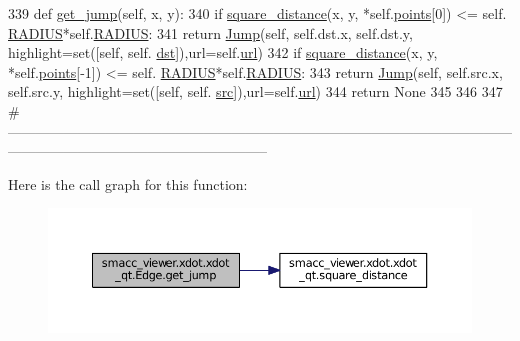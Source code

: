 \begin{DoxyCode}
339     \textcolor{keyword}{def }\hyperlink{classsmacc__viewer_1_1xdot_1_1xdot__qt_1_1Edge_a6cff1a5dcb4d832e98cdc92ddb130d9e}{get\_jump}(self, x, y):
340         \textcolor{keywordflow}{if} \hyperlink{namespacesmacc__viewer_1_1xdot_1_1xdot__qt_a15a27993ec08c2d9f757df121bb482f8}{square\_distance}(x, y, *self.\hyperlink{classsmacc__viewer_1_1xdot_1_1xdot__qt_1_1Edge_ac0a98c09c470ac737011283bb9e6108e}{points}[0]) <= self.
      \hyperlink{classsmacc__viewer_1_1xdot_1_1xdot__qt_1_1Edge_ad7c0b0732d1f024cf4bd1e379dd8d470}{RADIUS}*self.\hyperlink{classsmacc__viewer_1_1xdot_1_1xdot__qt_1_1Edge_ad7c0b0732d1f024cf4bd1e379dd8d470}{RADIUS}:
341             \textcolor{keywordflow}{return} \hyperlink{classsmacc__viewer_1_1xdot_1_1xdot__qt_1_1Jump}{Jump}(self, self.dst.x, self.dst.y, highlight=set([self, self.
      \hyperlink{classsmacc__viewer_1_1xdot_1_1xdot__qt_1_1Edge_ac3d671e3f4486291b249df4608b775b5}{dst}]),url=self.\hyperlink{classsmacc__viewer_1_1xdot_1_1xdot__qt_1_1Edge_acadf98140ce469bcbf1856232220ead7}{url})
342         \textcolor{keywordflow}{if} \hyperlink{namespacesmacc__viewer_1_1xdot_1_1xdot__qt_a15a27993ec08c2d9f757df121bb482f8}{square\_distance}(x, y, *self.\hyperlink{classsmacc__viewer_1_1xdot_1_1xdot__qt_1_1Edge_ac0a98c09c470ac737011283bb9e6108e}{points}[-1]) <= self.
      \hyperlink{classsmacc__viewer_1_1xdot_1_1xdot__qt_1_1Edge_ad7c0b0732d1f024cf4bd1e379dd8d470}{RADIUS}*self.\hyperlink{classsmacc__viewer_1_1xdot_1_1xdot__qt_1_1Edge_ad7c0b0732d1f024cf4bd1e379dd8d470}{RADIUS}:
343             \textcolor{keywordflow}{return} \hyperlink{classsmacc__viewer_1_1xdot_1_1xdot__qt_1_1Jump}{Jump}(self, self.src.x, self.src.y, highlight=set([self, self.
      \hyperlink{classsmacc__viewer_1_1xdot_1_1xdot__qt_1_1Edge_a5689e7ea2be54c94ae961b28c75199da}{src}]),url=self.\hyperlink{classsmacc__viewer_1_1xdot_1_1xdot__qt_1_1Edge_acadf98140ce469bcbf1856232220ead7}{url})
344         \textcolor{keywordflow}{return} \textcolor{keywordtype}{None}
345 
346 
347 \textcolor{comment}{
      #--------------------------------------------------------------------------------------------------------------------------------------------------------------------}
\end{DoxyCode}


Here is the call graph for this function\+:
\nopagebreak
\begin{figure}[H]
\begin{center}
\leavevmode
\includegraphics[width=350pt]{classsmacc__viewer_1_1xdot_1_1xdot__qt_1_1Edge_a6cff1a5dcb4d832e98cdc92ddb130d9e_cgraph}
\end{center}
\end{figure}




